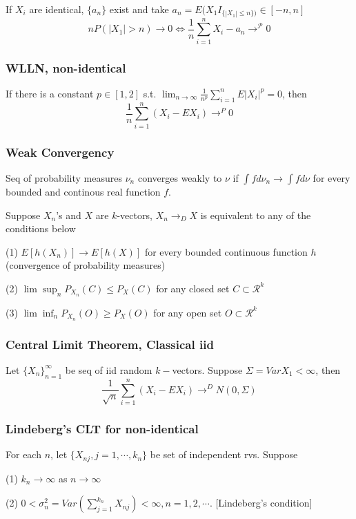 If $X_i$ are identical, $\{a_n\}$ exist and take $a_n= E(X_1I_{\{|X_1|\leq n\})} \in [-n, n]$
$$
nP(|X_1| > n) \rightarrow 0 \Leftrightarrow \frac{1}{n} \sum_{i=1}^n X_i - a_n \rightarrow^\mathcal{P} 0
$$

\subsubsection{WLLN, non-identical} If there is a constant $p\in[1, 2]$ s.t. $\lim_{n\rightarrow\infty}\frac{1}{n^p}\sum_{i=1}^n E|X_i|^p=0$, then
$$
\frac{1}{n}\sum_{i=1}^n (X_i-EX_i)\rightarrow^{P} 0
$$

\subsubsection{Weak Convergency}

Seq of probability measures $\nu_n$ converges weakly to $\nu$ if $\int f d\nu_n\rightarrow \int f d\nu$ for every bounded and continous real function $f$.

Suppose $X_n$'s and $X$ are $k$-vectors, $X_n\rightarrow_D X$ is equivalent to any of the conditions below

(1) $E[h(X_n)]\rightarrow E[h(X)]$ for every bounded continuous function $h$ (convergence of probability measures)

(2) $\lim\sup_n P_{X_n}(C)\leq P_X(C)$ for any closed set $C\subset \mathcal{R}^k$

(3) $\lim\inf_n P_{X_n}(O)\geq P_X(O)$ for any open set $O\subset \mathcal{R}^k$

\subsubsection{Central Limit Theorem, Classical iid}

Let $\{X_n\}_{n=1}^\infty$ be seq of iid random $k-$vectors. Suppose $\Sigma=VarX_1<\infty$, then
$$
\frac{1}{\sqrt{n}}\sum_{i=1}^n (X_i-EX_i)\rightarrow^D N(0, \Sigma)
$$

\subsubsection{Lindeberg's CLT for non-identical}

For each $n$, let $\{X_{nj}, j=1, \cdots, k_n\}$ be set of independent rvs. Suppose

(1) $k_n\rightarrow\infty$ as $n\rightarrow\infty$

(2) $0<\sigma_n^2 = Var\left(\sum_{j=1}^{k_n} X_{nj}\right)<\infty, n=1, 2, \cdots$. [Lindeberg's condition]

